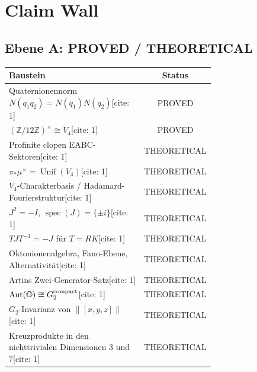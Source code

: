 \documentclass[11pt,a4paper]{article}
\newcommand{\OO}{\mathbb{O}}
\newcommand{\ZZ}{\mathbb{Z}}
\newcommand{\norm}[1]{\left\lVert #1 \right\rVert}
\newcommand{\Aut}{\operatorname{Aut}}
\newcommand{\Unif}{\operatorname{Unif}}
\begin{document}
	\section{Claim Wall}
	\subsection*{Ebene A: PROVED / THEORETICAL}
	\begin{center}
		\begin{tabular}{>{\raggedright\arraybackslash}p{0.69\linewidth}|c}
			\toprule
			\textbf{Baustein} & \textbf{Status}\\
			\midrule
			Quaternionennorm $N(q_1q_2)=N(q_1)N(q_2)$[cite: 1] & PROVED\\
			$(\ZZ/12\ZZ)^\times\cong V_4$[cite: 1] & PROVED\\
			Profinite clopen EABC-Sektoren[cite: 1] & THEORETICAL\\
			$\pi_*\mu^\times=\Unif(V_4)$[cite: 1] & THEORETICAL\\
			$V_4$-Charakterbasis / Hadamard-Fourierstruktur[cite: 1] & THEORETICAL\\
			$J^2=-I$, $\operatorname{spec}(J)=\{\pm i\}$[cite: 1] & THEORETICAL\\
			$TJT^{-1}=-J$ für $T=RK$[cite: 1] & THEORETICAL\\
			Oktonionenalgebra, Fano-Ebene, Alternativität[cite: 1] & THEORETICAL\\
			Artins Zwei-Generator-Satz[cite: 1] & THEORETICAL\\
			$\Aut(\OO)\cong G_2^{\rm compact}$[cite: 1] & THEORETICAL\\
			$G_2$-Invarianz von $\norm{[x,y,z]}$[cite: 1] & THEORETICAL\\
			Kreuzprodukte in den nichttrivialen Dimensionen $3$ und $7$[cite: 1] & THEORETICAL\\
			\bottomrule
		\end{tabular}
	\end{center}
	
\end{document}

